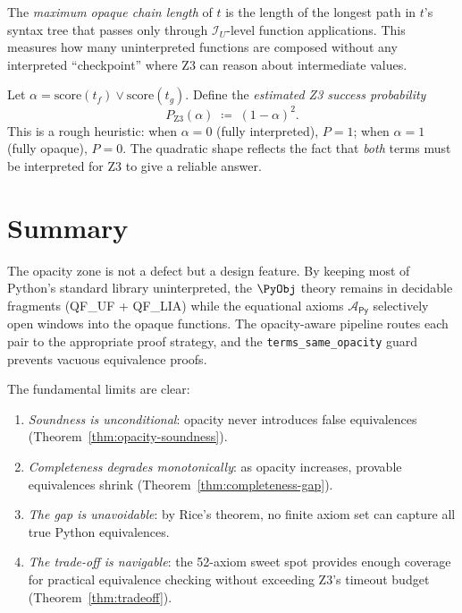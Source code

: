 \begin{definition}
\label{def:opaque-chain}
The \emph{maximum opaque chain length} of $t$ is the length of the
longest path in $t$'s syntax tree that passes only through
$\mathcal{I}_U$-level function applications.  This measures how
many uninterpreted functions are composed without any interpreted
``checkpoint'' where Z3 can reason about intermediate values.
\end{definition}

\begin{proposition}
\label{prop:completeness-estimate}
Let $\alpha = \mathrm{score}(t_f) \vee \mathrm{score}(t_g)$.
Define the \emph{estimated Z3 success probability}
\[
  P_{\mathrm{Z3}}(\alpha) \;\coloneqq\; (1 - \alpha)^2.
\]
This is a rough heuristic: when $\alpha = 0$ (fully interpreted),
$P = 1$; when $\alpha = 1$ (fully opaque), $P = 0$.  The quadratic
shape reflects the fact that \emph{both} terms must be interpreted
for Z3 to give a reliable answer.
\end{proposition}


\section{Summary}
\label{sec:opacity-summary}

The opacity zone is not a defect but a design feature.  By keeping
most of Python's standard library uninterpreted, the $\PyObj$
theory remains in decidable fragments (QF\_UF + QF\_LIA) while
the equational axioms $\mathcal{A}_{\mathsf{Py}}$ selectively open
windows into the opaque functions.  The opacity-aware pipeline
routes each pair to the appropriate proof strategy, and the
\texttt{terms\_same\_opacity} guard prevents vacuous equivalence
proofs.

The fundamental limits are clear:
\begin{enumerate}
  \item \emph{Soundness is unconditional}: opacity never introduces
    false equivalences (Theorem~\ref{thm:opacity-soundness}).
  \item \emph{Completeness degrades monotonically}: as opacity
    increases, provable equivalences shrink
    (Theorem~\ref{thm:completeness-gap}).
  \item \emph{The gap is unavoidable}: by Rice's theorem, no finite
    axiom set can capture all true Python equivalences.
  \item \emph{The trade-off is navigable}: the 52-axiom sweet spot
    provides enough coverage for practical equivalence checking
    without exceeding Z3's timeout budget
    (Theorem~\ref{thm:tradeoff}).
\end{enumerate}
